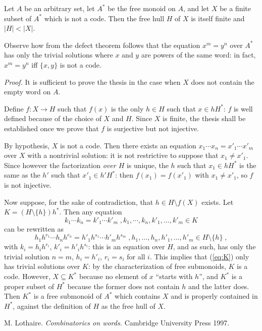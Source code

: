 \documentclass[12pt]{article}
\begin{document}
Let $A$ be an arbitrary set,
let $A^\ast$ be the free monoid on $A$,
and let $X$ be a finite subset of $A^\ast$ which is not a code.
Then the free hull $H$ of $X$ is itself finite
and $|H|<|X|$.

Observe how from the defect theorem
follows that the equation $x^m=y^n$ over $A^\ast$
has only the trivial solutions where $x$ and $y$ are powers of the same word:
in fact, $x^m=y^n$ iff $\{x,y\}$ is not a code.

\textit{Proof.}
It is sufficient to prove the thesis in the case
when $X$ does not contain the empty word on $A$.

Define $f:X\to H$ such that $f(x)$ is the only $h\in H$
such that $x\in hH^\ast$:
$f$ is well defined because of the choice of $X$ and $H$.
Since $X$ is finite, the thesis shall be established
once we prove that $f$ is surjective but not injective.

By hypothesis, $X$ is not a code.
Then there exists an equation $x_1\cdots x_n=x'_1\cdots x'_m$ over $X$
with a nontrivial solution:
it is not restrictive to suppose that $x_1\neq x'_1$.
Since however the factorization \emph{over $H$} is unique,
the $h$ such that $x_1\in hH^\ast$
is the same as the $h'$ such that $x'_1\in h'H^\ast$:
then $f(x_1)=f(x'_1)$ with $x_1\neq x'_1$,
so $f$ is not injective.

Now suppose, for the sake of contradiction,
that $h\in H\setminus f(X)$ exists.
Let $K=(H\setminus\{h\})h^\ast$.
Then any equation
\begin{equation} \label{eq:K}
k_1\cdots k_n=k'_1\cdots k'_m\;,k_1,\cdots,k_n,k'_1,\ldots,k'_m\in K
\end{equation}
can be rewritten as
\begin{displaymath}
h_1h^{r_1}\cdots h_nh^{r_n}=h'_1h^{s_1}\cdots h'_mh^{s_m}\;,
h_1,\ldots,h_n,h'_1,\ldots,h'_m\in H\setminus\{h\}\;,
\end{displaymath}
with $k_i=h_ih^{r_i}$, $k'_i=h'_ih^{s_i}$:
this is an equation over $H$,
and as such, has only the trivial solution $n=m$,
$h_i=h'_i$, $r_i=s_i$ for all $i$.
This implies that (\ref{eq:K}) only has trivial solutions over $K$:
by the characterization of free submonoids, $K$ is a code.
However, $X\subseteq K^\ast$ because no element of $x$ ``starts with $h$'',
and $K^\ast$ is a proper subset of $H^\ast$
because the former does not contain $h$ and the latter does.
Then $K^\ast$ is a free submonoid of $A^\ast$
which contains $X$ and is properly contained in $H^\ast$,
against the definition of $H$ as the free hull of $X$.

\begin{thebibliography}{99}

M. Lothaire.
\textit{Combinatorics on words.}
Cambridge University Press 1997.

\end{thebibliography}

\end{document}
